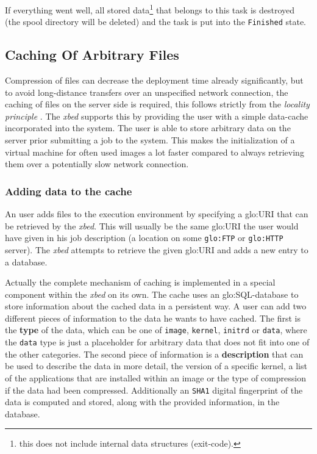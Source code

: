 If everything  went well, all  stored data\footnote{this does  not include
  internal data structures (\eg exit-code).}  that belongs to this task is
destroyed (\ie  the spool directory will  be deleted) and the  task is put
into the \texttt{Finished} state.

\subsection{Caching Of Arbitrary Files}
\label{sec:caching}

Compression   of  files   can   decrease  the   deployment  time   already
significantly, but  to avoid  long-distance transfers over  an unspecified
network connection, the  caching of files on the  server side is required,
this    follows    strictly    from    the    \emph{locality    principle}
\cite{locality-principle}.  The \emph{xbed} supports this by providing the
user with a  simple data-cache incorporated into the  system.  The user is
able to store  arbitrary data on the server prior submitting  a job to the
system. This makes the initialization  of a virtual machine for often used
images a lot faster compared  to always retrieving them over a potentially
slow network connection.

\subsubsection{Adding data to the cache}

An  user  adds  files  to   the  execution  environment  by  specifying  a
\gls{glo:URI} that can be retrieved by the \emph{xbed}.  This will usually
be the same \gls{glo:URI} the user would have given in his job description
(\eg a location  on some \texttt{\gls{glo:FTP}} or \texttt{\gls{glo:HTTP}}
server).  The \emph{xbed} attempts to retrieve the given \gls{glo:URI} and
adds a new entry to a database.

Actually the  complete mechanism  of caching is  implemented in  a special
component  within  the  \emph{xbed}  on   its  own.   The  cache  uses  an
\gls{glo:SQL}-database  to store information  about the  cached data  in a
persistent way. A user can add two different pieces of information to the
data he wants to have cached.  The first is the \textbf{type} of the data,
which can  be one  of \texttt{image}, \texttt{kernel},  \texttt{initrd} or
\texttt{data},  where the  \texttt{data} type  is just  a  placeholder for
arbitrary data  that does not fit  into one of the  other categories.  The
second piece of information is  a \textbf{description} that can be used to
describe the data in more detail,  \eg the version of a specific kernel, a
list of the applications that are installed within an image or the type of
compression   if  the   data   had  been   compressed.   Additionally   an
\texttt{SHA1}  digital fingerprint  of the  data is  computed  and stored,
along with the provided information, in the database.

